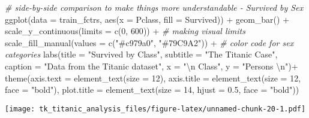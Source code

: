 \documentclass[
]{article}
\newenvironment{Shaded}{\begin{snugshade}}{\end{snugshade}}
\newcommand{\AttributeTok}[1]{\textcolor[rgb]{0.77,0.63,0.00}{#1}}
\newcommand{\CommentTok}[1]{\textcolor[rgb]{0.56,0.35,0.01}{\textit{#1}}}
\newcommand{\DecValTok}[1]{\textcolor[rgb]{0.00,0.00,0.81}{#1}}
\newcommand{\FloatTok}[1]{\textcolor[rgb]{0.00,0.00,0.81}{#1}}
\newcommand{\FunctionTok}[1]{\textcolor[rgb]{0.00,0.00,0.00}{#1}}
\newcommand{\NormalTok}[1]{#1}
\newcommand{\SpecialCharTok}[1]{\textcolor[rgb]{0.00,0.00,0.00}{#1}}
\newcommand{\StringTok}[1]{\textcolor[rgb]{0.31,0.60,0.02}{#1}}
\begin{document}
\begin{Shaded}
\begin{Highlighting}[]
\CommentTok{\# side{-}by{-}side comparison to make things more understandable {-} Survived by Sex}
\FunctionTok{ggplot}\NormalTok{(}\AttributeTok{data =}\NormalTok{ train\_fctrs, }\FunctionTok{aes}\NormalTok{(}\AttributeTok{x =}\NormalTok{ Pclass, }\AttributeTok{fill =}\NormalTok{ Survived)) }\SpecialCharTok{+} \FunctionTok{geom\_bar}\NormalTok{() }\SpecialCharTok{+}
  \FunctionTok{scale\_y\_continuous}\NormalTok{(}\AttributeTok{limits =} \FunctionTok{c}\NormalTok{(}\DecValTok{0}\NormalTok{, }\DecValTok{600}\NormalTok{)) }\SpecialCharTok{+}                \CommentTok{\# making visual limits}
  \FunctionTok{scale\_fill\_manual}\NormalTok{(}\AttributeTok{values =} \FunctionTok{c}\NormalTok{(}\StringTok{"\#c979a0"}\NormalTok{, }\StringTok{"\#79C9A2"}\NormalTok{)) }\SpecialCharTok{+}   \CommentTok{\# color code for sex categories}
  \FunctionTok{labs}\NormalTok{(}\AttributeTok{title =} \StringTok{"Survived by Class"}\NormalTok{, }
       \AttributeTok{subtitle =} \StringTok{"The Titanic Case"}\NormalTok{,}
       \AttributeTok{caption =} \StringTok{"Data from the Titanic dataset"}\NormalTok{, }
       \AttributeTok{x =} \StringTok{"}\SpecialCharTok{\textbackslash{}n}\StringTok{ Class"}\NormalTok{, }\AttributeTok{y =} \StringTok{"Persons }\SpecialCharTok{\textbackslash{}n}\StringTok{"}\NormalTok{)}\SpecialCharTok{+} 
  \FunctionTok{theme}\NormalTok{(}\AttributeTok{axis.text =} \FunctionTok{element\_text}\NormalTok{(}\AttributeTok{size =} \DecValTok{12}\NormalTok{), }
        \AttributeTok{axis.title =} \FunctionTok{element\_text}\NormalTok{(}\AttributeTok{size =} \DecValTok{12}\NormalTok{, }\AttributeTok{face =} \StringTok{"bold"}\NormalTok{), }
        \AttributeTok{plot.title =} \FunctionTok{element\_text}\NormalTok{(}\AttributeTok{size =} \DecValTok{14}\NormalTok{, }\AttributeTok{hjust =} \FloatTok{0.5}\NormalTok{, }\AttributeTok{face =} \StringTok{"bold"}\NormalTok{))}
\end{Highlighting}
\end{Shaded}

\texttt{[image: tk\_titanic\_analysis\_files/figure-latex/unnamed-chunk-20-1.pdf]}
\end{document}
